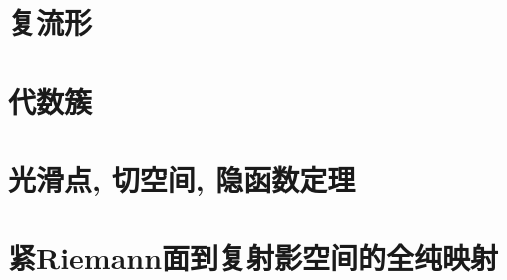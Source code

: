 \section{复流形}\label{s1-7}

\section{代数簇}\label{s1-8}

\section{光滑点, 切空间, 隐函数定理}\label{s1-9}

\section{紧Riemann面到复射影空间的全纯映射}\label{s1-10}
